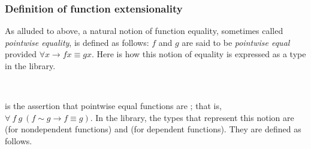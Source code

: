 \subsubsection{Definition of function extensionality}\label{sec:defin-funct-extens}

As alluded to above, a natural notion of function equality, sometimes called \emph{pointwise equality}, is defined as follows: \(f\) and \(g\) are said to be \emph{pointwise equal} provided \(∀ x → f x ≡ g x\). Here is how this notion of equality is expressed as a type in the \typetopology library.
\ccpad
\begin{code}%
\>[1]\AgdaSpace{}%
\AgdaSymbol{:}\AgdaSpace{}%
\AgdaSymbol{\{}\AgdaSpace{}%
\AgdaSpace{}%
\AgdaSymbol{:}\AgdaSpace{}%
\AgdaSymbol{\}\{}\AgdaSpace{}%
\AgdaSymbol{:}\AgdaSpace{}%
\AgdaSpace{}%
\AgdaSpace{}%
\AgdaSymbol{\}}\AgdaSpace{}%
\AgdaSymbol{\{}\AgdaSpace{}%
\AgdaSymbol{:}\AgdaSpace{}%
\AgdaSpace{}%
\AgdaSpace{}%
\AgdaSpace{}%
\AgdaSpace{}%
\AgdaSymbol{\}}\AgdaSpace{}%
\AgdaSpace{}%
\AgdaSpace{}%
\AgdaSpace{}%
\AgdaSpace{}%
\AgdaSpace{}%
\AgdaSpace{}%
\AgdaSpace{}%
\AgdaSpace{}%
\AgdaSpace{}%
\AgdaSpace{}%
\<%
\\
%
\>[1]\AgdaSpace{}%
\AgdaSpace{}%
\AgdaSpace{}%
\AgdaSymbol{=}\AgdaSpace{}%
\AgdaSpace{}%
\AgdaSpace{}%
\AgdaSpace{}%
\AgdaSpace{}%
\AgdaSpace{}%
\AgdaSpace{}%
\AgdaSpace{}%
\<%
\end{code}
\ccpad
{} is the assertion that pointwise equal functions are ; that is, \(\forall\ f\ g\ (f ∼ g → f ≡ g)\). In the \typetopology library, the types that represent this notion are  (for nondependent functions) and  (for dependent functions). They are defined as follows.
\ccpad
